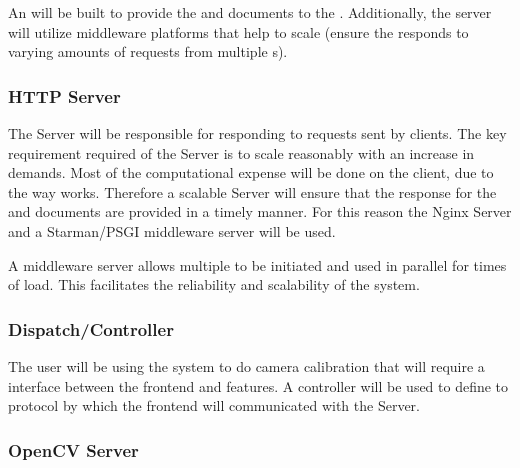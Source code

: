 \documentclass[11pt]{report}
\begin{document}

An  will be built to provide the  and  documents to the . Additionally, the server will utilize middleware platforms that help to scale (ensure the  responds to varying amounts of requests from multiple s).

\subsubsection{HTTP Server}


The  Server will be responsible for responding to requests sent by  clients. The key requirement required of the  Server is to scale reasonably with an increase in demands. Most of the computational expense will be done on the  client, due to the way  works. Therefore a scalable  Server will ensure that the response for the  and  documents are provided in a timely manner. For this reason the Nginx  Server and a Starman/PSGI middleware server will be used.

A middleware server allows multiple  to be initiated and used in parallel for times of load. This facilitates the reliability and scalability of the system. 

\subsubsection{Dispatch/Controller}


The user will be using the system to do camera calibration that will require a interface between the frontend and  features. A controller will be used to define to protocol by which the frontend will communicated with the  Server. 

\subsubsection{OpenCV Server}
\end{document}
